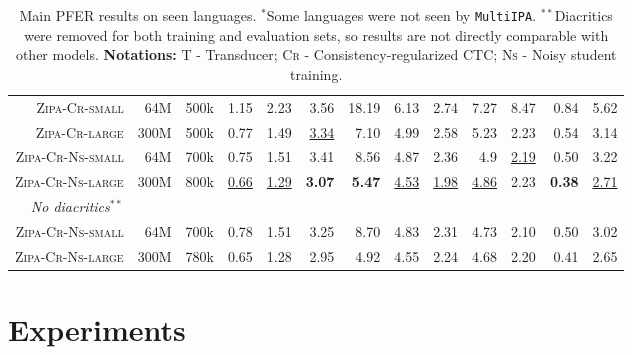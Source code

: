 \documentclass[11pt]{article}
\begin{document}
\begin{table}[]
{\begin{tabular}{rrcrrrrrrrrrr}
\textsc{Zipa-Cr-small}     &     64M       &     500k      &      1.15     &  2.23   &  3.56   &  18.19   & 6.13    &  2.74   &  7.27 & 8.47& 0.84 & 5.62  \\
\textsc{Zipa-Cr-large}     &     300M       &    500k       &      0.77     &  1.49   & \underline{3.34}    &  7.10   &  4.99   &  2.58   & 5.23  & 2.23& 0.54 & 3.14 \\\midrule
\textsc{Zipa-Cr-Ns-small}     &     64M       &     700k      &  0.75 &  1.51 &  3.41 & 8.56 & 4.87 & 2.36 &  4.9 & \underline{2.19} & 0.50 & 3.22 \\
\textsc{Zipa-Cr-Ns-large}     &     300M       &    800k       &  \underline{0.66} & \underline{1.29} & \textbf{3.07} & \textbf{5.47} &  \underline{4.53} & \underline{1.98} & \underline{4.86} & 2.23 & \textbf{0.38}  & \underline{2.71}   \\\midrule
\textit{No diacritics$^{**}$} \\\midrule
\textsc{Zipa-Cr-Ns-small}     &     64M       &     700k      &  0.78 &  1.51 &  3.25 & 8.70 & 4.83 & 2.31 &  4.73 & 2.10 & 0.50 & 3.02 \\
\textsc{Zipa-Cr-Ns-large}     &     300M       &    780k       &  0.65 & 1.28 & 2.95 & 4.92 &  4.55 & 2.24 & 4.68 & 2.20 & 0.41  & 2.65   \\
\bottomrule
\end{tabular}
}
\caption{Main PFER results on seen languages. $^*$Some languages were not seen by \texttt{MultiIPA}. $^{**}$Diacritics were removed for both training and evaluation sets, so results are not directly comparable with other models. \textbf{Notations:} \textsc{T} - Transducer; \textsc{Cr} - Consistency-regularized CTC; \textsc{Ns} - Noisy student training. }
\label{tab:seen}
\end{table}

\section{Experiments}
\end{document}

